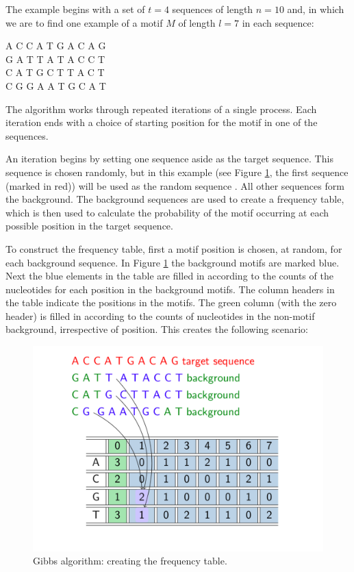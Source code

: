 \documentclass[12pt]{article}
\begin{document}
The example begins with a set of  $t=4$ sequences of length $n=10$ and, in which we are to find one example of a motif $M$ of length $l=7$ in each sequence:
\begin{center}
A  C  C  A  T  G  A  C  A  G\\
G  A  T  T  A  T  A  C  C  T\\
C  A  T  G  C  T  T  A  C  T\\
C  G  G  A  A  T  G  C  A  T\\
\end{center}
The algorithm works through repeated iterations of a single process. Each iteration ends with a choice of starting position for the motif in one of the sequences.

An iteration begins by setting one sequence aside as the target sequence. This sequence is chosen randomly, but in this example (see Figure \ref{gibbs1}, the first sequence (marked in red)) will be used as the random sequence . All other sequences form the background. The background sequences are used to create a frequency table, which is then used to calculate the probability of the motif occurring at each possible position in the target sequence.

To construct the frequency table, first a motif position is chosen, at random, for each background sequence. In Figure \ref{gibbs1} the background motifs are marked blue. Next the blue elements in the table are filled in according to the counts of the nucleotides for each position in the background motifs. The column headers in the table indicate the positions in the motifs. The green column (with the zero header) is filled in according to the counts of nucleotides in the non-motif background, irrespective of position. This creates the following scenario:

\begin{figure}[htbp]
\centering
\includegraphics[width=0.7\linewidth]{GibbsTable.pdf}
\caption{Gibbs algorithm: creating the frequency table.}\label{gibbs1}
\end{figure}
\end{document}
